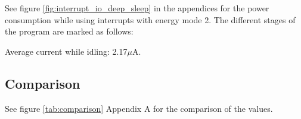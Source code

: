 See figure \ref{fig:interrupt_io_deep_sleep} in the appendices for the power consumption while using interrupts with energy mode 2. The different stages of the program are marked as follows:

Average current while idling: 2.17$\mu$A.

\subsection{Comparison}

See figure \ref{tab:comparison} Appendix A for the comparison of the values.
